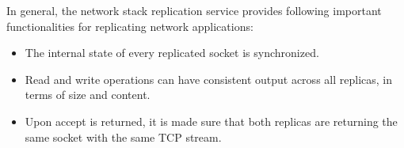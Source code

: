 In general, the network stack replication service provides following important functionalities for replicating network applications:
\begin{itemize}
\item The internal state of every replicated socket is synchronized.
\item Read and write operations can have consistent output across all replicas, in terms of size and content.
\item Upon accept is returned, it is made sure that both replicas are returning the same socket with the same TCP stream.
\end{itemize}